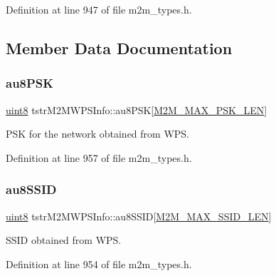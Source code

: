 Definition at line 947 of file m2m\+\_\+types.\+h.



\subsection{Member Data Documentation}
\mbox{\label{structtstrM2MWPSInfo_a38d83b9735bd2ebc5304d1f6d3c6c879}} 
\subsubsection{\texorpdfstring{au8\+P\+SK}{au8PSK}}
{\footnotesize\ttfamily \hyperlink{group__DataT_ga4df709a77647e870bbf1d955b8edc9a6}{uint8} tstr\+M2\+M\+W\+P\+S\+Info\+::au8\+P\+SK\mbox{[}\hyperlink{group__WlanDefines_ga790a7e0471ff8a179238863dc2021f6d}{M2\+M\+\_\+\+M\+A\+X\+\_\+\+P\+S\+K\+\_\+\+L\+EN}\mbox{]}}

P\+SK for the network obtained from W\+PS. 

Definition at line 957 of file m2m\+\_\+types.\+h.

\mbox{\label{structtstrM2MWPSInfo_a679b8247d9099096deffa1522dccbbde}} 
\subsubsection{\texorpdfstring{au8\+S\+S\+ID}{au8SSID}}
{\footnotesize\ttfamily \hyperlink{group__DataT_ga4df709a77647e870bbf1d955b8edc9a6}{uint8} tstr\+M2\+M\+W\+P\+S\+Info\+::au8\+S\+S\+ID\mbox{[}\hyperlink{group__WlanDefines_gab2bd95c18ede2fbc07b44c5660cc0097}{M2\+M\+\_\+\+M\+A\+X\+\_\+\+S\+S\+I\+D\+\_\+\+L\+EN}\mbox{]}}

S\+S\+ID obtained from W\+PS. 

Definition at line 954 of file m2m\+\_\+types.\+h.

\mbox{\label{structtstrM2MWPSInfo_a6d61ebf61a47c7a83231fac0800c49c9}} 
